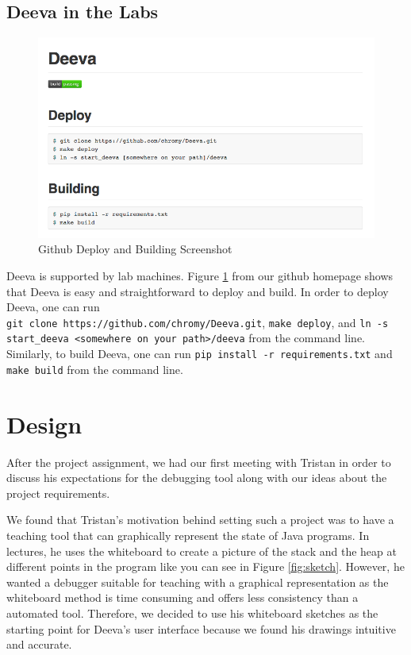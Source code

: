 \documentclass[11pt, a4paper]{article}
\begin{document}
\subsection{Deeva in the Labs}
\begin{figure}[h!]
\centering
\includegraphics[scale=0.5]{buildFeature.png}
\caption{Github Deploy and Building Screenshot}
\label{fig:buildFeature}
\end{figure}
Deeva is supported by lab machines.
Figure \ref{fig:buildFeature} from our github homepage shows that Deeva is easy and straightforward to deploy and build.
In order to deploy Deeva, one can run \\
{\tt git clone https://github.com/chromy/Deeva.git}, {\tt make deploy}, and {\tt ln -s start\_deeva <somewhere on your path>/deeva} from the command line.
Similarly, to build Deeva, one can run {\tt pip install -r requirements.txt} and {\tt make build} from the command line.

\section{Design}

After the project assignment, we had our first meeting with Tristan in order to discuss his expectations for the debugging tool along with our ideas about the project requirements.

We found that Tristan's motivation behind setting such a project was to have a teaching tool that can graphically represent the state of Java programs. In lectures, he uses the whiteboard to create a picture of the stack and the heap at different points in the program like you can see in Figure \ref{fig:sketch}. However, he wanted a debugger suitable for teaching with a graphical representation as the whiteboard method is time consuming and offers less consistency than a automated tool.
Therefore, we decided to use his whiteboard sketches as the starting point for Deeva's user interface because we found his drawings intuitive and accurate.
\end{document}
